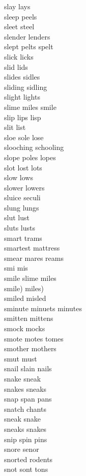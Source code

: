 slay lays\\
sleep peels\\
sleet steel\\
slender lenders\\
slept pelts spelt\\
slick licks\\
slid lids\\
slides sidles\\
sliding sidling\\
slight lights\\
slime miles smile\\
slip lips lisp\\
slit list\\
sloe sole lose\\
slooching schooling\\
slope poles lopes\\
slot lost lots\\
slow lows\\
slower lowers\\
sluice seculi\\
slung lungs\\
slut lust\\
sluts lusts\\
smart trams\\
smartest mattress\\
smear mares reams\\
smi mis\\
smile slime miles\\
smile) miles)\\
smiled misled\\
sminute minuets minutes\\
smitten mittens\\
smock mocks\\
smote motes tomes\\
smother mothers\\
smut must\\
snail slain nails\\
snake sneak\\
snakes sneaks\\
snap span pans\\
snatch chants\\
sneak snake\\
sneaks snakes\\
snip spin pins\\
snore senor\\
snorted rodents\\
snot sont tons\\
